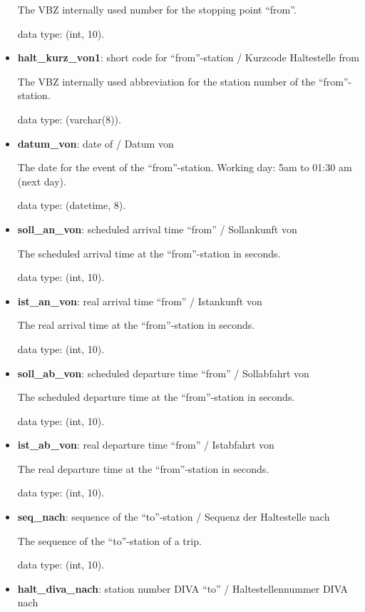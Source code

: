 \documentclass[11pt]{article}
\begin{document}
\begin{itemize}
	The VBZ internally used number for the stopping point ``from''.
	
	data type: (int, 10).
	
	\item \textbf{halt\_kurz\_von1}: short code for ``from''-station / Kurzcode Haltestelle from
	
	The VBZ internally used abbreviation for the station number of the ``from''-station.
	
	data type: (varchar(8)).
	
	\item \textbf{datum\_von}: date of / Datum von 
	
	The date for the event of the ``from''-station. Working day: 5am to 01:30 am (next day).
	
	data type: (datetime, 8).
	
	\item \textbf{soll\_an\_von}: scheduled arrival time ``from'' / Sollankunft von
	
	The scheduled arrival time at the ``from''-station in seconds.
	
	data type: (int, 10).
	
	\item \textbf{ist\_an\_von}: real arrival time ``from'' / Istankunft von
	
	The real arrival time at the ``from''-station in seconds.
	
	data type: (int, 10).
	
	\item \textbf{soll\_ab\_von}: scheduled departure time ``from'' / Sollabfahrt
	von
	
	The scheduled departure time at the ``from''-station in seconds.
	
	data type: (int, 10).
	
	\item \textbf{ist\_ab\_von}: real departure time ``from'' / Istabfahrt von

	The real departure time at the ``from''-station in seconds.
	
	data type: (int, 10).
	
	\item \textbf{seq\_nach}: sequence of the ``to''-station / Sequenz der Haltestelle nach
	
	The sequence of the ``to''-station of a trip.
	
	data type: (int, 10).
	
	\item \textbf{halt\_diva\_nach}: station number DIVA ``to'' / Haltestellennummer DIVA nach
	

\end{itemize}
\end{document}
